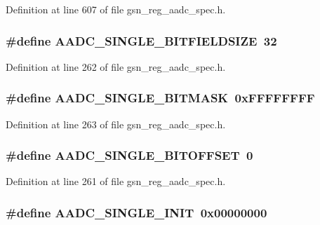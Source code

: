 Definition at line 607 of file gsn\_\-reg\_\-aadc\_\-spec.h.

\hypertarget{a00543_a2af571c474315ea3a177f4d8056c45e6}{
\subsubsection[{AADC\_\-SINGLE\_\-BITFIELDSIZE}]{\setlength{\rightskip}{0pt plus 5cm}\#define AADC\_\-SINGLE\_\-BITFIELDSIZE~32}}
\label{a00543_a2af571c474315ea3a177f4d8056c45e6}


Definition at line 262 of file gsn\_\-reg\_\-aadc\_\-spec.h.

\hypertarget{a00543_ae455894f9406636e4f9334b9be4a6ed4}{
\subsubsection[{AADC\_\-SINGLE\_\-BITMASK}]{\setlength{\rightskip}{0pt plus 5cm}\#define AADC\_\-SINGLE\_\-BITMASK~0xFFFFFFFF}}
\label{a00543_ae455894f9406636e4f9334b9be4a6ed4}


Definition at line 263 of file gsn\_\-reg\_\-aadc\_\-spec.h.

\hypertarget{a00543_a470aec6bca04f32f6a4ba56c6c9805c8}{
\subsubsection[{AADC\_\-SINGLE\_\-BITOFFSET}]{\setlength{\rightskip}{0pt plus 5cm}\#define AADC\_\-SINGLE\_\-BITOFFSET~0}}
\label{a00543_a470aec6bca04f32f6a4ba56c6c9805c8}


Definition at line 261 of file gsn\_\-reg\_\-aadc\_\-spec.h.

\hypertarget{a00543_a433a8c7136eeaa2fa9bf8aa2b06bb4f5}{
\subsubsection[{AADC\_\-SINGLE\_\-INIT}]{\setlength{\rightskip}{0pt plus 5cm}\#define AADC\_\-SINGLE\_\-INIT~0x00000000}}
\label{a00543_a433a8c7136eeaa2fa9bf8aa2b06bb4f5}


